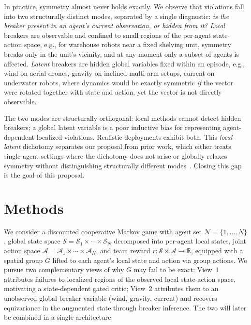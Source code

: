 \documentclass[11pt]{article}
\begin{document}
In practice, symmetry almost never holds exactly. We observe that violations fall into two structurally distinct modes, separated by a single diagnostic: \emph{is the breaker present in an agent's current observation, or hidden from it?} \emph{Local} breakers are observable and confined to small regions of the per-agent state-action space, e.g., for warehouse robots near a fixed shelving unit, symmetry breaks only in the unit's vicinity, and at any moment only a subset of agents is affected. \emph{Latent} breakers are hidden global variables fixed within an episode, e.g., wind on aerial drones, gravity on inclined multi-arm setups, current on underwater robots, where dynamics would be exactly symmetric \emph{if} the vector were rotated together with state and action, yet the vector is not directly observable.

The two modes are structurally orthogonal: local methods cannot detect hidden breakers; a global latent variable is a poor inductive bias for representing agent-dependent localized violations. Realistic deployments exhibit both. This \emph{local-latent} dichotomy separates our proposal from prior work, which either treats single-agent settings where the dichotomy does not arise or globally relaxes symmetry without distinguishing structurally different modes~\citep{finzi2021rpp,wang2022approx,romero2022partial,vanderouderaa2022relaxing,hofgard2024relaxed,park2025approximate,chang2026partially}. Closing this gap is the goal of this proposal.

\section{Methods}
We consider a discounted cooperative Markov game with agent set $\mathcal{N} = \{1, \dots, N\}$,
global state space $\mathcal{S}=\mathcal{S}_1 \times \cdots \times \mathcal{S}_N$ decomposed into per-agent local states,
joint action space $\mathcal{A} = \mathcal{A}_1 \times \cdots \times \mathcal{A}_N$,
and team reward $r\colon \mathcal{S} \times \mathcal{A} \to \mathbb{R}$, 
equipped with a spatial group $G$ lifted to each agent's local state and action via group actions. We pursue two complementary views of why $G$ may fail to be exact: View~1 attributes failures to localized regions of the observed local state-action space, motivating a state-dependent gated critic; View~2 attributes them to an unobserved global breaker variable (wind, gravity, current) and recovers equivariance in the augmented state through breaker inference. The two will later be combined in a single architecture.
\end{document}
